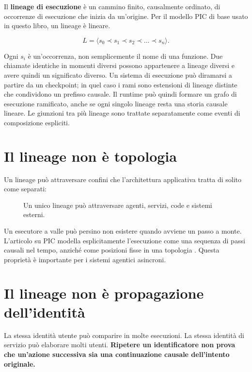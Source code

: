 \documentclass[10pt,oneside,openany]{book}
\newcommand{\term}[1]{\textbf{#1}}
\begin{document}
Il \term{lineage di esecuzione} è un cammino finito, causalmente ordinato, di occorrenze di esecuzione che inizia da un'origine. Per il modello PIC di base usato in questo libro, un lineage è lineare.
\begin{formulabox}
\[
L = \langle s_0 \prec s_1 \prec s_2 \prec \dots \prec s_n \rangle.
\]
\end{formulabox}
Ogni \(s_i\) è un'occorrenza, non semplicemente il nome di una funzione. Due chiamate identiche in momenti diversi possono appartenere a lineage diversi e avere quindi un significato diverso. Un sistema di esecuzione può diramarsi a partire da un checkpoint; in quel caso i rami sono estensioni di lineage distinte che condividono un prefisso causale. Il runtime può quindi formare un grafo di esecuzione ramificato, anche se ogni singolo lineage resta una storia causale lineare. Le giunzioni tra più lineage sono trattate separatamente come eventi di composizione espliciti.

\section{Il lineage non è topologia}
Un lineage può attraversare confini che l'architettura applicativa tratta di solito come separati:

\begin{figure}[ht]
\centering
{}
\caption{Un unico lineage può attraversare agenti, servizi, code e sistemi esterni.}
\end{figure}

Un esecutore a valle può persino non esistere quando avviene un passo a monte. L'articolo su PIC modella esplicitamente l'esecuzione come una sequenza di passi causali nel tempo, anziché come posizioni fisse in una topologia \cite{gallo2026pic}. Questa proprietà è importante per i sistemi agentici asincroni.

\section{Il lineage non è propagazione dell'identità}
La stessa identità utente può comparire in molte esecuzioni. La stessa identità di servizio può elaborare molti utenti. \textbf{Ripetere un identificatore non prova che un'azione successiva sia una continuazione causale dell'intento originale.}
\end{document}
